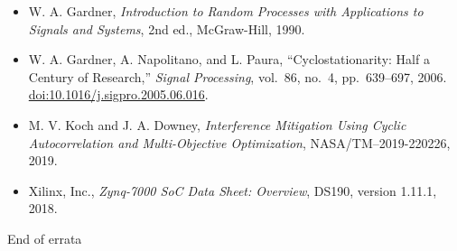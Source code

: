 \documentclass[12pt]{article}
\begin{document}
\begin{itemize}
  \item W. A. Gardner, \textit{Introduction to Random Processes with Applications to Signals and Systems}, 2nd ed., McGraw-Hill, 1990.
  \item W. A. Gardner, A. Napolitano, and L. Paura, ``Cyclostationarity: Half a Century of Research,'' \textit{Signal Processing}, vol.~86, no.~4, pp.~639--697, 2006.\\
  \href{https://doi.org/10.1016/j.sigpro.2005.06.016}{doi:10.1016/j.sigpro.2005.06.016}.
  \item M. V. Koch and J. A. Downey, \textit{Interference Mitigation Using Cyclic Autocorrelation and Multi-Objective Optimization}, NASA/TM--2019-220226, 2019.
  \item Xilinx, Inc., \textit{Zynq-7000 SoC Data Sheet: Overview}, DS190, version 1.11.1, 2018.
\end{itemize}

\vfill
\begin{center}
\singlespacing
End of errata
\end{center}
\end{document}
